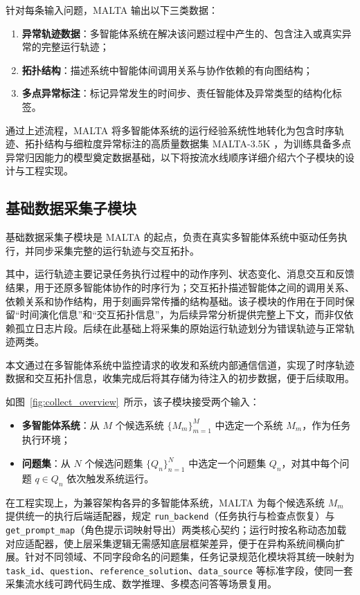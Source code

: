 针对每条输入问题，MALTA 输出以下三类数据：
\begin{enumerate}
  \item \textbf{异常轨迹数据}：多智能体系统在解决该问题过程中产生的、包含注入或真实异常的完整运行轨迹；
  \item \textbf{拓扑结构}：描述系统中智能体间调用关系与协作依赖的有向图结构；
  \item \textbf{多点异常标注}：标记异常发生的时间步、责任智能体及异常类型的结构化标签。
\end{enumerate}

通过上述流程，MALTA 将多智能体系统的运行经验系统性地转化为包含时序轨迹、拓扑结构与细粒度异常标注的高质量数据集 MALTA-3.5K ，为训练具备多点异常归因能力的模型奠定数据基础，以下将按流水线顺序详细介绍六个子模块的设计与工程实现。


\subsection{基础数据采集子模块}

基础数据采集子模块是 MALTA 的起点，负责在真实多智能体系统中驱动任务执行，并同步采集完整的运行轨迹与交互拓扑。

其中，运行轨迹主要记录任务执行过程中的动作序列、状态变化、消息交互和反馈结果，用于还原多智能体协作的时序行为；交互拓扑描述智能体之间的调用关系、依赖关系和协作结构，用于刻画异常传播的结构基础。该子模块的作用在于同时保留“时间演化信息”和“交互拓扑信息”，为后续异常分析提供完整上下文，而非仅依赖孤立日志片段。后续在此基础上将采集的原始运行轨迹划分为错误轨迹与正常轨迹两类。

本文通过在多智能体系统中监控请求的收发和系统内部通信信道，实现了时序轨迹数据和交互拓扑信息，收集完成后将其存储为待注入的初步数据，便于后续取用。

 
如图~\ref{fig:collect_overview}~所示，该子模块接受两个输入：
 
\begin{itemize}
  \item \textbf{多智能体系统}：从 $M$ 个候选系统 $\{M_m\}_{m=1}^{M}$ 中选定一个系统 $M_m$，作为任务执行环境；
  \item \textbf{问题集}：从 $N$ 个候选问题集 $\{Q_n\}_{n=1}^{N}$ 中选定一个问题集 $Q_n$，对其中每个问题 $q \in Q_n$ 依次触发系统运行。
\end{itemize}

在工程实现上，为兼容架构各异的多智能体系统，MALTA 为每个候选系统 $M_m$ 提供统一的执行后端适配器，规定 \texttt{run\_backend}（任务执行与检查点恢复）与 \texttt{get\_prompt\_map}（角色提示词映射导出）两类核心契约；运行时按名称动态加载对应适配器，使上层采集逻辑无需感知底层框架差异，便于在异构系统间横向扩展。针对不同领域、不同字段命名的问题集，任务记录规范化模块将其统一映射为 \texttt{task\_id}、\texttt{question}、\texttt{reference\_solution}、\texttt{data\_source} 等标准字段，使同一套采集流水线可跨代码生成、数学推理、多模态问答等场景复用。

